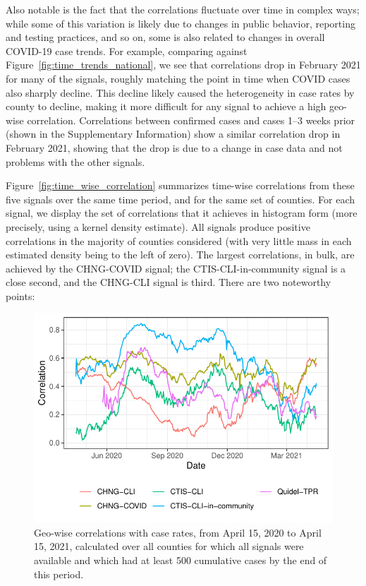 \documentclass[11pt]{article}
\begin{document}
Also notable is the fact that the correlations fluctuate over time in complex
ways; while some of this variation is likely due to changes in public behavior,
reporting and testing practices, and so on, some is also related to changes in
overall COVID-19 case trends. For example, comparing against
Figure~\ref{fig:time_trends_national}, we see that correlations drop in February
2021 for many of the signals, roughly matching the point in time when COVID
cases also sharply decline. This decline likely caused the heterogeneity in case
rates by county to decline, making it more difficult for any signal to achieve a
high geo-wise correlation. Correlations between confirmed cases and cases 1--3
weeks prior (shown in the Supplementary Information) show a similar correlation
drop in February 2021, showing that the drop is due to a change in case data and
not problems with the other signals.

Figure~\ref{fig:time_wise_correlation} summarizes time-wise correlations from
these five signals over the same time period, and for the same set of counties.
For each signal, we display the set of correlations that it achieves in
histogram form (more precisely, using a kernel density estimate). All signals
produce positive correlations in the majority of counties considered (with very
little mass in each estimated density being to the left of zero). The largest
correlations, in bulk, are achieved by the CHNG-COVID signal; the
CTIS-CLI-in-community signal is a close second, and the CHNG-CLI signal is
third. There are two noteworthy points:

\begin{figure}[t]
  \centering
  \includegraphics[width=0.6\columnwidth]{fig/geo_wise_corr.pdf}
  \caption{Geo-wise correlations with case rates, from April 15, 2020 to April
    15, 2021, calculated over all counties for which all signals were available
    and which had at least 500 cumulative cases by the end of this period.}
  \label{fig:geo_wise_correlation}
\end{figure}
\end{document}
